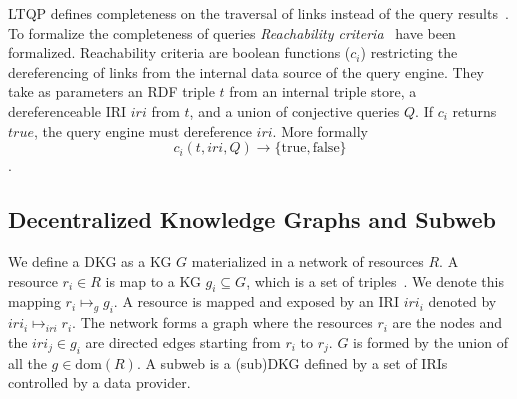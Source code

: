 LTQP defines completeness on the traversal of links instead of the query results~\cite{Hartig2012}.
To formalize the completeness of queries \emph{Reachability criteria}~\cite{Hartig2012} have been formalized.
Reachability criteria are boolean functions ($c_i$) restricting the dereferencing of links from the internal data source of the query engine.
They take as parameters an RDF triple $t$ from an internal triple store, a dereferenceable IRI $iri$ from $t$, and a union of conjective queries $Q$.
If $c_i$ returns $true$, the query engine must dereference $iri$.
More formally
\begin{equation}\label{eq:reachabilityCriteria}
c_i(t, iri, Q) \rightarrow \{\mathrm{true}, \mathrm{false}\}
\end{equation}
.

\subsection{Decentralized Knowledge Graphs and Subweb}\label{sec:dkg}

We define a DKG as a KG $G$ materialized in a network of resources $R$.
A resource $r_i \in R$ is map to a KG $g_i \subseteq G$, which is a set of triples~\cite{w3ConceptsAbstract}.
We denote this mapping $r_i \mapsto_{g} g_i$.
A resource is mapped and exposed by an IRI $iri_i$ denoted by $iri_i \mapsto_{iri} r_i$.
The network forms a graph where the resources $r_i$ are the nodes and the $iri_j \in g_i$ are directed edges starting from $r_i$ to $r_j$.
$G$ is formed by the union of all the $g \in \text{dom}(R)$. %
A subweb is a (sub)DKG defined by a set of IRIs controlled by a data provider.